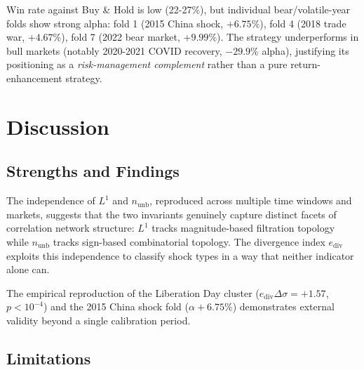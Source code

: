 \documentclass[11pt]{article}
\begin{document}
Win rate against Buy \& Hold is low (22-27\%), but individual bear/volatile-year
folds show strong alpha: fold 1 (2015 China shock, $+6.75\%$), fold 4 (2018
trade war, $+4.67\%$), fold 7 (2022 bear market, $+9.99\%$). The strategy
underperforms in bull markets (notably 2020-2021 COVID recovery, $-29.9\%$
alpha), justifying its positioning as a \emph{risk-management complement}
rather than a pure return-enhancement strategy.

\section{Discussion}

\subsection{Strengths and Findings}

The independence of $L^1$ and $n_{\mathrm{unb}}$, reproduced across multiple
time windows and markets, suggests that the two invariants genuinely capture
distinct facets of correlation network structure: $L^1$ tracks magnitude-based
filtration topology while $n_{\mathrm{unb}}$ tracks sign-based combinatorial
topology. The divergence index $e_{\mathrm{div}}$ exploits this independence to
classify shock types in a way that neither indicator alone can.

The empirical reproduction of the Liberation Day cluster ($e_{\mathrm{div}}
\Delta\sigma = +1.57$, $p < 10^{-4}$) and the 2015 China shock fold ($\alpha +6.75\%$)
demonstrates external validity beyond a single calibration period.

\subsection{Limitations}
\end{document}
